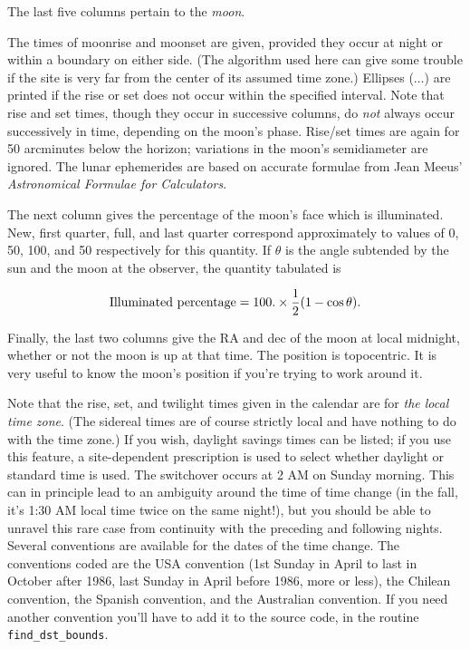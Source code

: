 The last five columns pertain to the {\it moon}.  

The times of moonrise and moonset are given, provided they 
occur at night or within a boundary on either side.  (The algorithm
used here can give some trouble if the site is very far from the
center of its assumed time zone.)
Ellipses ($\ldots$) are printed if
the rise or set does not occur within the specified interval.  Note
that rise and set times, though they occur in successive columns,
do {\it not} always occur successively in time, depending on the moon's
phase.  Rise/set times are again for 50 arcminutes below the horizon;
variations in the moon's semidiameter are ignored.  The lunar ephemerides 
are based on accurate formulae from Jean Meeus' {\it Astronomical
Formulae for Calculators}.

The next column gives the percentage of the moon's face which is
illuminated.  New, first quarter, full, and last quarter
correspond approximately to values of 0, 50, 100, and 50
respectively for this quantity.  If $\theta$ is the angle subtended by
the sun and the moon at the observer, the quantity tabulated is

$$\hbox{Illuminated percentage} = 100. \times {1 \over 2}(1 - \cos \theta ).$$

Finally, the last two columns give the RA and dec of the moon at local
midnight, whether or not the moon is up at that time.  The position
is topocentric.  It is very useful to know the moon's position 
if you're trying to work around it.


Note that the rise, set, and twilight times given in the calendar 
are for {\it the local time zone}.  (The sidereal times are of course 
strictly local and have nothing to do with the time zone.)  If 
you wish, daylight savings times can be listed; if you use
this feature, a site-dependent prescription is used to select
whether daylight or standard time is used.  The
switchover occurs at 2 AM on Sunday morning.  This can in principle
lead to an ambiguity around the time of time change (in the fall,
it's 1:30 AM local time twice on the same night!), but you should
be able to unravel this rare case from continuity with the
preceding and following nights.  Several conventions are
available for the dates of the time change.
The conventions coded are the USA convention (1st
Sunday in April to last in October after 1986, last Sunday in April
before 1986, more or less), the Chilean convention, the 
Spanish convention, and the Australian convention.  If you need 
another convention you'll have to
add it to the source code, in the routine {\tt find\_dst\_bounds}.

